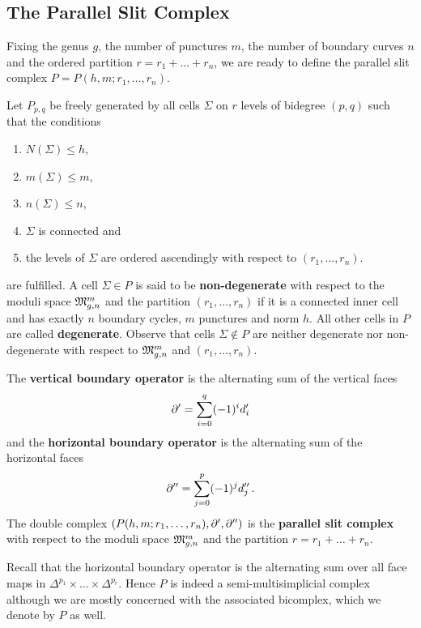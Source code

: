 \subsection{The Parallel Slit Complex}
\label{cellular_models:parallel:bicomplex}
Fixing the genus $g$, the number of punctures $m$, the number of boundary curves $n$ and the ordered partition $r = r_1 + \ldots + r_n$,
we are ready to define the parallel slit complex $P = P(h,m;r_1, \ldots, r_n)$.

\begin{defi}
\label{cellular_models:parallel:parallel_slit_complex}
Let $P_{p,q}$ be freely generated by all cells $\Sigma$ on $r$ levels of bidegree $(p,q)$ such that the conditions
\begin{enumerate}
    \item $N(\Sigma) \le h$,
    \item $m(\Sigma) \le m$,
    \item $n(\Sigma) \le n$,
    \item $\Sigma$ is connected and
    \item the levels of $\Sigma$ are ordered ascendingly with respect to $(r_1, \ldots, r_n)$.
\end{enumerate}
are fulfilled.
A cell $\Sigma \in P$ is said to be {\bfseries non-degenerate} with respect to the moduli space $\Modspc[n]$ and the partition $(r_1, \ldots, r_n)$
if it is a connected inner cell and has exactly $n$ boundary cycles, $m$ punctures and norm $h$.
All other cells in $P$ are called {\bfseries degenerate}.
Observe that cells $\Sigma \notin P$ are neither degenerate nor non-degenerate with respect to $\Modspc[n]$ and $(r_1, \ldots, r_n)$.

The {\bfseries vertical boundary operator} is the alternating sum of the vertical faces
\[
    \del' = \sum_{i=0}^{q}(-1)^i d'_i
\]
and the {\bfseries horizontal boundary operator} is the alternating sum of the horizontal faces
\[
    \del'' = \sum_{j=0}^{p}(-1)^j d''_j \,.
\]
The double complex $(P(h,m;r_1, \ldots, r_n), \del', \del'')$ is the {\bfseries parallel slit complex} with respect to the moduli space $\Modspc[n]$ and the partition $r = r_1 + \ldots + r_n$.
\end{defi}

\begin{rem}
Recall that the horizontal boundary operator is the alternating sum over all face maps in $\Delta^{p_1} \times \ldots \times \Delta^{p_r}$.
Hence $P$ is indeed a semi-multisimplicial complex although we are mostly concerned with the associated bicomplex, which we denote by $P$ as well.
\end{rem}

